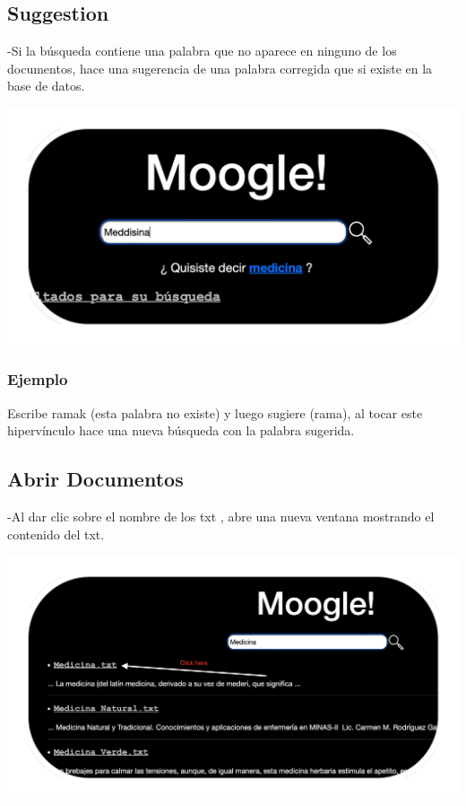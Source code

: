 \documentclass[a4paper,12pt]{article}
\begin{document}
    \newpage

    \subsection{Suggestion}\label{sub:Suggestion}
    -Si la búsqueda contiene una palabra que no aparece en ninguno de
    los documentos, hace una sugerencia de una palabra corregida
    que si existe en la base de datos.
    \begin{center}
        \includegraphics[scale=0.2]{Pictures/EjSuggestion.JPEG}
    \end{center}
    \subsubsection{Ejemplo}
    Escribe ramak (esta palabra no existe) y luego sugiere (rama), al tocar este hipervínculo
    hace una nueva búsqueda con la palabra sugerida.
    \subsection{Abrir Documentos}\label{sub:OpenDocs}
    -Al dar clic sobre el nombre de los txt , abre una nueva ventana mostrando el contenido del txt.
    \begin{center}
        \includegraphics[scale=0.2]{Pictures/EjOpenDocs.JPEG}
    \end{center}
\end{document}
